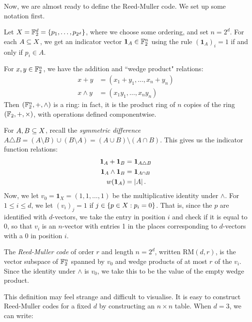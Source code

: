 \documentclass{article}
\begin{document}
Now, we are almost ready to define the Reed-Muller code. We set up some notation first.

\begin{remark}
	\label{reed-muller-code-setup}
    Let $X = \mathbb{F}_2^d = \left\lbrace p_1, \dots, p_{2^d} \right\rbrace$, where we choose some ordering, and set $n = 2^d$. For each $A \subseteq X$, we get an indicator vector $\mathbf{1}_A \in \mathbb{F}_2^n$ using the rule $(\mathbf{1}_A)_i = 1$ if and only if $p_i \in A$.
    
    For $x, y \in \mathbb{F}_2^n$, we have the addition and ``wedge product" relations:
    \begin{align*}
	    x + y &= (x_1 + y_1, \dots, x_n + y_n) \\
	    x \land y &= (x_1 y_1, \dots, x_n y_n)
	\end{align*}
	Then $(\mathbb{F}_2^n, +, \land)$ is a ring: in fact, it is the product ring of $n$ copies of the ring $(\mathbb{F}_2, +, \times)$, with operations defined componentwise.
	
	For $A, B \subseteq X$, recall the \textit{symmetric difference} $A \triangle B = (A \setminus B) \cup (B \setminus A) = (A \cup B) \setminus (A \cap B)$. This gives us the indicator function relations:
	\begin{align*}
	    \mathbf{1}_A + \mathbf{1}_B &= \mathbf{1}_{A \triangle B} \\
	    \mathbf{1}_A \land \mathbf{1}_B &= \mathbf{1}_{A \cap B} \\
	    w(\mathbf{1}_A) &= \left\lvert A \right\rvert.
	\end{align*}
	Now, we let $v_0 = \mathbf{1}_X = (1, 1, \dots, 1)$ be the multiplicative identity under $\land$. For $1 \leq i \leq d$, we let $(v_i)_j = 1$ if $j \in \left\lbrace p \in X: p_i = 0 \right\rbrace$. That is, since the $p$ are identified with $d$-vectors, we take the entry in position $i$ and check if it is equal to $0$, so that $v_i$ is an $n$-vector with entries 1 in the places corresponding to $d$-vectors with a 0 in position $i$.
\end{remark}

\begin{definition}
    The \textit{Reed-Muller code} of order $r$ and length $n = 2^d$, written $\mathrm{RM}(d, r)$, is the vector subspace of $\mathbb{F}_2^n$ spanned by $v_0$ and wedge products of at most $r$ of the $v_i$. Since the identity under $\land$ is $v_0$, we take this to be the value of the empty wedge product.
\end{definition}

This definition may feel strange and difficult to visualise. It is easy to construct Reed-Muller codes for a fixed $d$ by constructing an $n \times n$ table. When $d = 3$, we can write:
\end{document}
